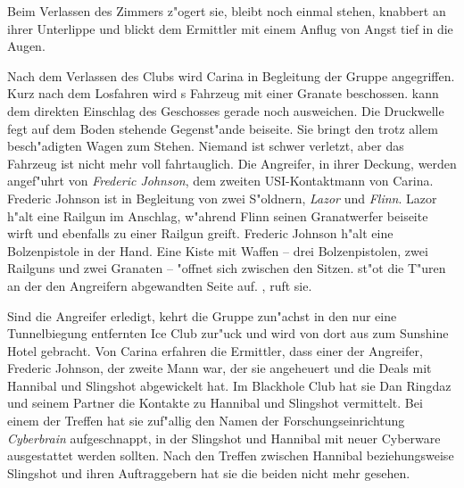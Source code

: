 Beim Verlassen des Zimmers z"ogert sie, bleibt noch einmal stehen, knabbert an ihrer Unterlippe und blickt dem Ermittler mit einem Anflug von Angst tief in die Augen.


Nach dem Verlassen des Clubs wird Carina in Begleitung der Gruppe angegriffen. Kurz nach dem Losfahren wird \xl{}s Fahrzeug mit einer Granate beschossen. \xl{} kann dem direkten Einschlag des Geschosses gerade noch ausweichen. Die Druckwelle fegt auf dem Boden stehende Gegenst"ande beiseite. Sie bringt den trotz allem besch"adigten Wagen zum Stehen. Niemand ist schwer verletzt, aber das Fahrzeug ist nicht mehr voll fahrtauglich. Die Angreifer, in ihrer Deckung, werden angef"uhrt von \emph{Frederic Johnson}, dem zweiten USI-Kontaktmann von Carina. Frederic Johnson ist in Begleitung von zwei S"oldnern, \emph{Lazor} und \emph{Flinn}. Lazor h"alt eine Railgun im Anschlag, w"ahrend Flinn seinen Granatwerfer beiseite wirft und ebenfalls zu einer Railgun greift. Frederic Johnson h"alt eine Bolzenpistole in der Hand. Eine Kiste mit Waffen -- drei Bolzenpistolen, zwei Railguns und zwei Granaten -- "offnet sich zwischen den Sitzen. \xl{} st"o\3t die T"uren an der den Angreifern abgewandten Seite auf. , ruft sie.

Sind die Angreifer erledigt, kehrt die Gruppe zun"achst in den nur eine Tunnelbiegung entfernten Ice Club zur"uck und wird von dort aus zum Sunshine Hotel gebracht. Von Carina erfahren die Ermittler, dass einer der Angreifer, Frederic Johnson, der zweite Mann war, der sie angeheuert und die Deals mit Hannibal und Slingshot abgewickelt hat. Im Blackhole Club hat sie Dan Ringdaz und seinem Partner die Kontakte zu Hannibal und Slingshot vermittelt. Bei einem der Treffen hat sie zuf"allig den Namen der Forschungseinrichtung \emph{Cyberbrain} aufgeschnappt, in der Slingshot und Hannibal mit neuer Cyberware ausgestattet werden sollten. Nach den Treffen zwischen Hannibal beziehungsweise Slingshot und ihren Auftraggebern hat sie die beiden nicht mehr gesehen.

